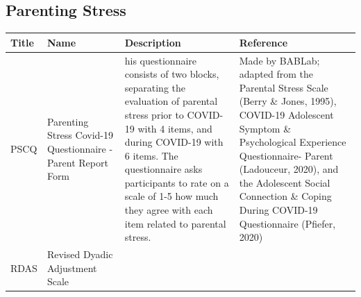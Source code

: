 \documentclass[]{book}
\begin{document}
\hypertarget{parenting-stress}{%
\subsection{Parenting Stress}\label{parenting-stress}}

\begin{longtable}[]{@{}llll@{}}
\toprule
\begin{minipage}[b]{0.22\columnwidth}\raggedright
Title\strut
\end{minipage} & \begin{minipage}[b]{0.27\columnwidth}\raggedright
Name\strut
\end{minipage} & \begin{minipage}[b]{0.22\columnwidth}\raggedright
Description\strut
\end{minipage} & \begin{minipage}[b]{0.18\columnwidth}\raggedright
Reference\strut
\end{minipage}\tabularnewline
\midrule
\endhead
\begin{minipage}[t]{0.22\columnwidth}\raggedright
PSCQ\strut
\end{minipage} & \begin{minipage}[t]{0.27\columnwidth}\raggedright
Parenting Stress Covid-19 Questionnaire - Parent Report Form\strut
\end{minipage} & \begin{minipage}[t]{0.22\columnwidth}\raggedright
his questionnaire consists of two blocks, separating the evaluation of parental stress prior to COVID-19 with 4 items, and during COVID-19 with 6 items. The questionnaire asks participants to rate on a scale of 1-5 how much they agree with each item related to parental stress.\strut
\end{minipage} & \begin{minipage}[t]{0.18\columnwidth}\raggedright
Made by BABLab; adapted from the Parental Stress Scale (Berry \& Jones, 1995), COVID-19 Adolescent Symptom \& Psychological Experience Questionnaire- Parent (Ladouceur, 2020), and the Adolescent Social Connection \& Coping During COVID-19 Questionnaire (Pfiefer, 2020)\strut
\end{minipage}\tabularnewline
\begin{minipage}[t]{0.22\columnwidth}\raggedright
RDAS\strut
\end{minipage} & \begin{minipage}[t]{0.27\columnwidth}\raggedright
Revised Dyadic Adjustment Scale\strut
\end{minipage} & \begin{minipage}[t]{0.22\columnwidth}\raggedright

\end{minipage}
\end{longtable}
\end{document}
